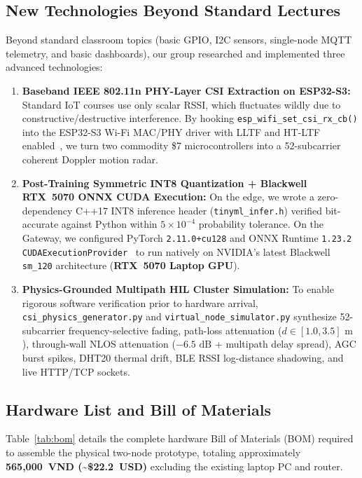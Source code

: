 \documentclass{hcmut-report}
\begin{document}
\subsection[New Technologies Beyond Lectures]{New Technologies Beyond Standard Lectures}
\label{sec:new_tech}

Beyond standard classroom topics (basic GPIO, I2C sensors, single-node MQTT telemetry, and basic dashboards), our group researched and implemented three advanced technologies:
\begin{enumerate}
  \item \textbf{Baseband IEEE 802.11n PHY-Layer CSI Extraction on ESP32-S3:} Standard IoT courses use only scalar RSSI, which fluctuates wildly due to constructive/destructive interference. By hooking \texttt{esp\_wifi\_set\_csi\_rx\_cb()} into the ESP32-S3 Wi-Fi MAC/PHY driver with LLTF and HT-LTF enabled~\cite{espressif_csi}, we turn two commodity \$7 microcontrollers into a 52-subcarrier coherent Doppler motion radar.
  \item \textbf{Post-Training Symmetric INT8 Quantization + Blackwell RTX~5070 ONNX CUDA Execution:} On the edge, we wrote a zero-dependency C++17 INT8 inference header (\texttt{tinyml\_infer.h}) verified bit-accurate against Python within $5\times 10^{-4}$ probability tolerance. On the Gateway, we configured PyTorch \texttt{2.11.0+cu128} and ONNX Runtime \texttt{1.23.2} \texttt{CUDAExecutionProvider}~\cite{onnxruntime_docs} to run natively on NVIDIA's latest Blackwell \texttt{sm\_120} architecture (\textbf{RTX~5070 Laptop GPU}).
  \item \textbf{Physics-Grounded Multipath HIL Cluster Simulation:} To enable rigorous software verification prior to hardware arrival, \texttt{csi\_physics\_generator.py} and \texttt{virtual\_node\_simulator.py} synthesize 52-subcarrier frequency-selective fading, path-loss attenuation ($d \in [1.0, 3.5]\text{ m}$), through-wall NLOS attenuation ($-6.5\text{ dB}$ + multipath delay spread), AGC burst spikes, DHT20 thermal drift, BLE RSSI log-distance shadowing, and live HTTP/TCP sockets.
\end{enumerate}

\subsection[Hardware List and Bill of Materials]{Hardware List and Bill of Materials}
\label{sec:bom}

Table~\ref{tab:bom} details the complete hardware Bill of Materials (BOM) required to assemble the physical two-node prototype, totaling approximately \textbf{565,000~VND (\textasciitilde\$22.2~USD)} excluding the existing laptop PC and router.
\end{document}
